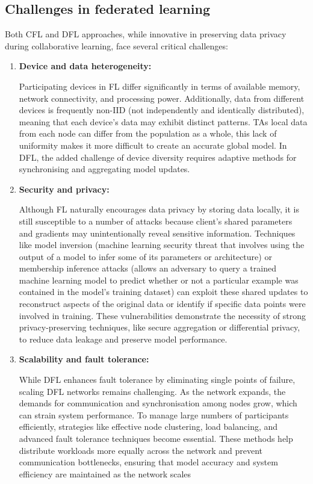 \begin{enumerate}
\end{enumerate}


\subsection{Challenges in federated learning}
\label{sub:challenges_in_fl}

Both CFL and DFL approaches, while innovative in preserving data privacy during collaborative learning, face several critical challenges:

\begin{enumerate}
	\item \textbf{Device and data heterogeneity:}
	
	Participating devices in \gls{FL} differ significantly in terms of available memory, network connectivity, and processing power. Additionally, data from different devices is frequently non-IID (not independently and identically distributed), meaning that each device's data may exhibit distinct patterns. TAs local data from each node can differ from the population as a whole, this lack of uniformity makes it more difficult to create an accurate global model. In \gls{DFL}, the added challenge of device diversity requires adaptive methods for synchronising and aggregating model updates. ​
	\item \textbf{Security and privacy:}
	
	Although FL naturally encourages data privacy by storing data locally, it is still susceptible to a number of attacks because client’s shared parameters and gradients may unintentionally reveal sensitive information. Techniques like model inversion (machine learning security threat that involves using the output of a model to infer some of its parameters or architecture) or membership inference attacks (allows an adversary to query a trained machine learning model to predict whether or not a particular example was contained in the model's training dataset) can exploit these shared updates to reconstruct aspects of the original data or identify if specific data points were involved in training. These vulnerabilities demonstrate the necessity of strong privacy-preserving techniques, like secure aggregation or differential privacy, to reduce data leakage and preserve model performance.
	\item \textbf{Scalability and fault tolerance:} 
	
	While DFL enhances fault tolerance by eliminating single points of failure, scaling DFL networks remains challenging. As the network expands, the demands for communication and synchronisation among nodes grow, which can strain system performance. To manage large numbers of participants efficiently, strategies like effective node clustering, load balancing, and advanced fault tolerance techniques become essential. These methods help distribute workloads more equally across the network and prevent communication bottlenecks, ensuring that model accuracy and system efficiency are maintained as the network scales

\end{enumerate}

